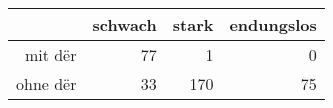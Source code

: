 \begin{tabular}{rrrr}
  \hline
 & schwach & stark & endungslos \\ 
  \hline
mit dër & 77 & 1 & 0 \\ 
  ohne dër & 33 & 170 & 75 \\ 
   \hline
\end{tabular}
